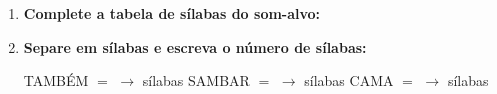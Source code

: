 \begin{exercicio}
\begin{enumerate}[resume]
  \item \textbf{Complete a tabela de sílabas do som-alvo:}

\begin{center}
\end{center}

  \item \textbf{Separe em sílabas e escreva o número de sílabas:}
  \begin{center}
  TAMBÉM $=$ \underline{\hspace{1.2cm}} $\rightarrow$ \underline{\hspace{0.8cm}} sílabas \quad SAMBAR $=$ \underline{\hspace{1.2cm}} $\rightarrow$ \underline{\hspace{0.8cm}} sílabas \quad CAMA $=$ \underline{\hspace{1.2cm}} $\rightarrow$ \underline{\hspace{0.8cm}} sílabas
  \end{center}

\end{enumerate}

\end{exercicio}



